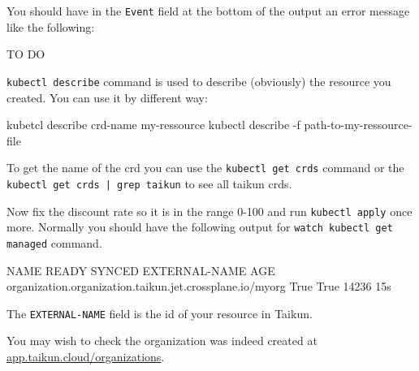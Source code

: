 You should have in the \texttt{Event} field at the bottom of the output an error message
 like the following:
\begin{raw}

TO DO

\end{raw}

\begin{tip}
\texttt{kubectl describe} command is used to describe (obviously) the resource you 
created. You can use it by different way:

\begin{shell}
kubetcl describe crd-name my-ressource
kubectl describe -f path-to-my-ressource-file
\end{shell}
To get the name of the crd you can use the \texttt{kubectl get crds} command or the 
\texttt{kubectl get crds | grep taikun} to see all taikun crds.
\end{tip}

Now fix the discount rate so it is in the range 0-100 and run \texttt{kubectl apply} once
 more. Normally you should have the following output for \texttt{watch kubectl get managed}
  command.

\begin{raw}
NAME                                                      READY SYNCED EXTERNAL-NAME AGE
organization.organization.taikun.jet.crossplane.io/myorg  True  True   14236         15s
\end{raw}

\begin{tip}
The \texttt{EXTERNAL-NAME} field is the id of your resource in Taikun.
\end{tip}

You may wish to check the organization was indeed created at
\href{https://app.taikun.cloud/organizations}{app.taikun.cloud/organizations}.

